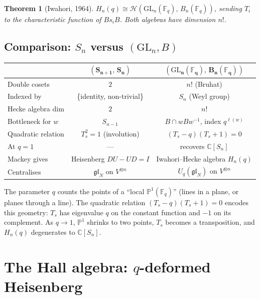 \documentclass[12pt,a4paper]{article}
\newtheorem{theorem}{Theorem}[section]
\theoremstyle{definition}
\theoremstyle{remark}
\newcommand{\C}{\mathbb{C}}
\newcommand{\F}{\mathbb{F}}
\newcommand{\gl}{\mathfrak{gl}}
\newcommand{\GL}{\mathrm{GL}}
\newcommand{\Hecke}{\mathcal{H}}
\begin{document}
\begin{theorem}[Iwahori, 1964]\label{thm:iwahori}
$H_n(q) \cong \Hecke(\GL_n(\F_q),\, B_n(\F_q))$,
sending $T_i$ to the characteristic function of $B s_i B$.
Both algebras have dimension $n!$.
\end{theorem}

\subsection{Comparison: $S_n$ versus $(\GL_n, B)$}

\begin{center}
\renewcommand{\arraystretch}{1.5}
\begin{tabular}{@{}p{4cm}cc@{}}
\toprule
& $\boldsymbol{(S_{n+1},\, S_n)}$
& $\boldsymbol{(\GL_n(\F_q),\, B_n(\F_q))}$ \\
\midrule
Double cosets & $2$ & $n!$ (Bruhat) \\
Indexed by & \{identity, non-trivial\}
  & $S_n$ (Weyl group) \\
Hecke algebra dim & $2$ & $n!$ \\
Bottleneck for $w$ & $S_{n-1}$ & $B \cap wBw^{-1}$, index $q^{\ell(w)}$ \\
Quadratic relation & $T_s^2 = 1$ (involution)
  & $(T_s - q)(T_s + 1) = 0$ \\
At $q = 1$ & --- & recovers $\C[S_n]$ \\
Mackey gives & Heisenberg $DU - UD = I$
  & Iwahori--Hecke algebra $H_n(q)$ \\
Centralises & $\gl_N$ on $V^{\otimes n}$
  & $U_q(\gl_N)$ on $V^{\otimes n}$ \\
\bottomrule
\end{tabular}
\end{center}

The parameter $q$ counts the points of a ``local
$\mathbb{P}^1(\F_q)$'' (lines in a plane, or planes through a line).
The quadratic relation $(T_s - q)(T_s + 1) = 0$ encodes this
geometry: $T_s$ has eigenvalue $q$ on the constant function and $-1$
on its complement. As $q \to 1$, $\mathbb{P}^1$ shrinks to two
points, $T_s$ becomes a transposition, and $H_n(q)$ degenerates to
$\C[S_n]$.

\section{The Hall algebra: $q$-deformed Heisenberg}
\label{sec:hall}
\end{document}
